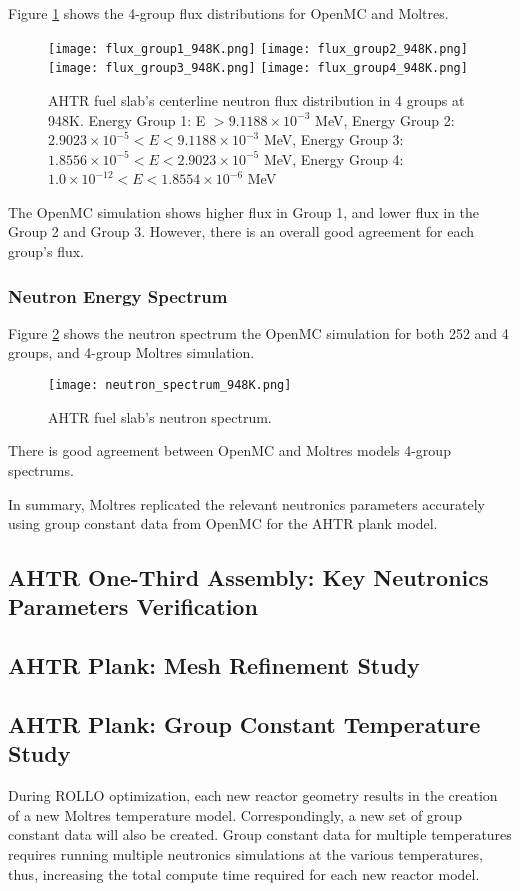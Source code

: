 Figure \ref{fig:flux_948K} shows the 4-group flux distributions for OpenMC and 
Moltres. 
\begin{figure}[]
    \centering
    \texttt{[image: flux\_group1\_948K.png]} 
    \texttt{[image: flux\_group2\_948K.png]} 
    \texttt{[image: flux\_group3\_948K.png]} 
    \texttt{[image: flux\_group4\_948K.png]} 
    \caption{AHTR fuel slab's centerline neutron flux distribution in 4 groups
    at 948K. 
    Energy Group 1: E $> 9.1188 \times 10^{-3}$ MeV, 
    Energy Group 2: $2.9023 \times 10^{-5} < E < 9.1188 \times 10^{-3}$ MeV,
    Energy Group 3:  $1.8556 \times 10^{-5} < E < 2.9023 \times 10^{-5}$ MeV,
    Energy Group 4:  $1.0 \times 10^{-12} < E < 1.8554 \times 10^{-6}$ MeV}
    \label{fig:flux_948K}
\end{figure}
The OpenMC simulation shows higher flux in Group 1, and lower flux in the
Group 2 and Group 3. 
However, there is an overall good agreement for each group's flux.  

\subsubsection{Neutron Energy Spectrum}
Figure \ref{fig:neutron_spectrum_948K} shows the neutron spectrum the OpenMC simulation 
for both 252 and 4 groups, and 4-group Moltres simulation. 
 \begin{figure}[]
    \centering
    \texttt{[image: neutron\_spectrum\_948K.png]}
    \caption{AHTR fuel slab's neutron spectrum.}  
    \label{fig:neutron_spectrum_948K}
\end{figure}
There is good agreement between OpenMC and Moltres models 4-group spectrums. 

In summary, Moltres replicated the relevant neutronics parameters accurately 
using group constant data from OpenMC for the \gls{AHTR} plank model. 

\subsection{AHTR One-Third Assembly: Key Neutronics Parameters Verification}

\subsection{AHTR Plank: Mesh Refinement Study}

\subsection{AHTR Plank: Group Constant Temperature Study}
During ROLLO optimization, each new reactor geometry results in the creation of 
a new Moltres temperature model. 
Correspondingly, a new set of group constant data will also be created. 
Group constant data for multiple temperatures requires running multiple neutronics 
simulations at the various temperatures, thus, increasing the total compute time 
required for each new reactor model. 

